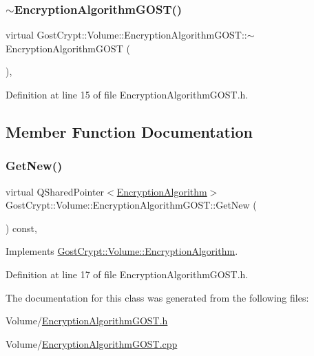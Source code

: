 \subsubsection{\texorpdfstring{$\sim$\+Encryption\+Algorithm\+G\+O\+S\+T()}{~EncryptionAlgorithmGOST()}}
{\footnotesize\ttfamily virtual Gost\+Crypt\+::\+Volume\+::\+Encryption\+Algorithm\+G\+O\+S\+T\+::$\sim$\+Encryption\+Algorithm\+G\+O\+ST (\begin{DoxyParamCaption}{ }\end{DoxyParamCaption})\hspace{0.3cm}{\ttfamily [inline]}, {\ttfamily [virtual]}}



Definition at line 15 of file Encryption\+Algorithm\+G\+O\+S\+T.\+h.



\subsection{Member Function Documentation}
\mbox{\label{class_gost_crypt_1_1_volume_1_1_encryption_algorithm_g_o_s_t_a32ea0c511bbc1e8445ff09c300d2f40b}} 
\subsubsection{\texorpdfstring{Get\+New()}{GetNew()}}
{\footnotesize\ttfamily virtual Q\+Shared\+Pointer$<$\hyperlink{class_gost_crypt_1_1_volume_1_1_encryption_algorithm}{Encryption\+Algorithm}$>$ Gost\+Crypt\+::\+Volume\+::\+Encryption\+Algorithm\+G\+O\+S\+T\+::\+Get\+New (\begin{DoxyParamCaption}{ }\end{DoxyParamCaption}) const\hspace{0.3cm}{\ttfamily [inline]}, {\ttfamily [virtual]}}



Implements \hyperlink{class_gost_crypt_1_1_volume_1_1_encryption_algorithm_ab77654d47cfabd0937eab82beaaac277}{Gost\+Crypt\+::\+Volume\+::\+Encryption\+Algorithm}.



Definition at line 17 of file Encryption\+Algorithm\+G\+O\+S\+T.\+h.



The documentation for this class was generated from the following files\+:\begin{DoxyCompactItemize}
\item 
Volume/\hyperlink{_encryption_algorithm_g_o_s_t_8h}{Encryption\+Algorithm\+G\+O\+S\+T.\+h}\item 
Volume/\hyperlink{_encryption_algorithm_g_o_s_t_8cpp}{Encryption\+Algorithm\+G\+O\+S\+T.\+cpp}\end{DoxyCompactItemize}
